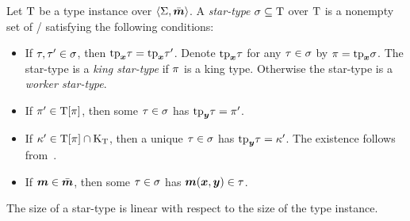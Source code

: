 \begin{definition}
Let $\mathrm{T}$ be a type instance over $\left\langle \mathrm{\Sigma},\bar{\bm{m}} \right\rangle$.
A \emph{star-type} $\sigma \subseteq \mathrm{T}$ over $\mathrm{T}$ is a nonempty
set of \twotypes/ satisfying the following conditions:
\begin{itemize}
  \item[\condstpx]\label{cond:stpx}
  If $\tau, {\tau'} \in \sigma$, then $\mathrm{tp}_{\bm{x}}\tau = \mathrm{tp}_{\bm{x}}{\tau'}$.
  Denote $\mathrm{tp}_{\bm{x}}\tau$ for any $\tau \in \sigma$ by $\pi=\mathrm{tp}_{\bm{x}}\sigma$.
  The star-type is a \emph{king star-type} if $\pi$ is a king type.
  Otherwise the star-type is a \emph{worker star-type}.
  
  \item[\condstppy]\label{cond:stppy}
  If ${\pi'} \in \mathrm{T}[\pi]$, then some $\tau\in\sigma$ has
  $\mathrm{tp}_{\bm{y}}\tau = {\pi'}$.
  
  \item[\condstpky]\label{cond:stpky}
  If ${\kappa'} \in \mathrm{T}[\pi]\cap{\mathrm{K}}_{\mathrm{T}}$, then a unique $\tau\in\sigma$ has
  $\mathrm{tp}_{\bm{y}}\tau = {\kappa'}$. The existence follows from~.
  
  \item[\condstpm]\label{cond:stpm}
  If $\bm{m} \in \bar{\bm{m}}$, then some $\tau\in\sigma$ has $\bm{m}(\bm{x},\bm{y}) \in \tau$.
\end{itemize}
The size of a star-type is linear with respect to the size of the type instance.
\end{definition}

